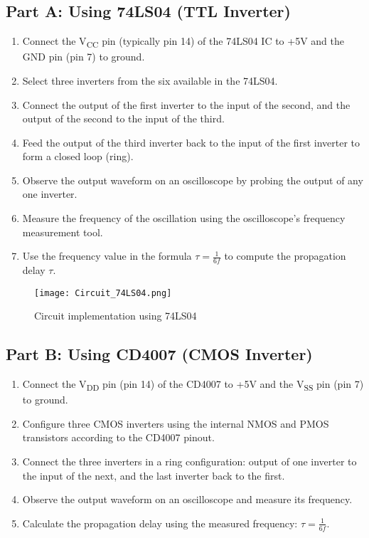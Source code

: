 \documentclass[conference]{IEEEtran}
\begin{document}
\subsection{Part A: Using 74LS04 (TTL Inverter)}
\begin{enumerate}
    \item Connect the V\textsubscript{CC} pin (typically pin 14) of the 74LS04 IC to +5V and the GND pin (pin 7) to ground.
    \item Select three inverters from the six available in the 74LS04.
    \item Connect the output of the first inverter to the input of the second, and the output of the second to the input of the third.
    \item Feed the output of the third inverter back to the input of the first inverter to form a closed loop (ring).
    \item Observe the output waveform on an oscilloscope by probing the output of any one inverter.
    \item Measure the frequency of the oscillation using the oscilloscope’s frequency measurement tool.
    \item Use the frequency value in the formula \( \tau = \frac{1}{6f} \) to compute the propagation delay $\tau$.
\end{enumerate}

\begin{figure}[H]
\centering
\texttt{[image: Circuit\_74LS04.png]}
\caption{Circuit implementation using 74LS04}
\label{fig:circuit_74LS04}
\end{figure}

\subsection{Part B: Using CD4007 (CMOS Inverter)}
\begin{enumerate}
    \item Connect the V\textsubscript{DD} pin (pin 14) of the CD4007 to +5V and the V\textsubscript{SS} pin (pin 7) to ground.
    \item Configure three CMOS inverters using the internal NMOS and PMOS transistors according to the CD4007 pinout.
    \item Connect the three inverters in a ring configuration: output of one inverter to the input of the next, and the last inverter back to the first.
    \item Observe the output waveform on an oscilloscope and measure its frequency.
    \item Calculate the propagation delay using the measured frequency: \( \tau = \frac{1}{6f} \).
\end{enumerate}
\end{document}
